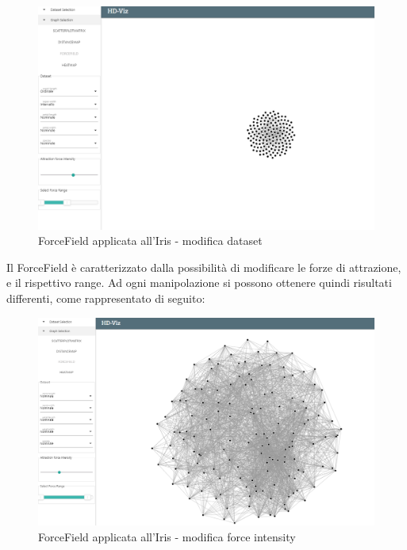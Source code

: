 \documentclass[../manuale_utente.tex]{subfiles}
\begin{document}
\begin{figure}[H]
	\centering
	\includegraphics[width=18cm]{img/ff/ff_iris_1}
	\caption{ForceField applicata all'Iris - modifica dataset}
\end{figure}


Il ForceField è caratterizzato dalla possibilità di modificare le forze di attrazione, e il rispettivo range. Ad ogni manipolazione si possono ottenere quindi risultati differenti, 
come rappresentato di seguito:

\begin{figure}[H]
	\centering
	\includegraphics[width=18cm]{img/ff/ff_iris_2}
	\caption{ForceField applicata all'Iris - modifica force intensity}
\end{figure}
\end{document}
